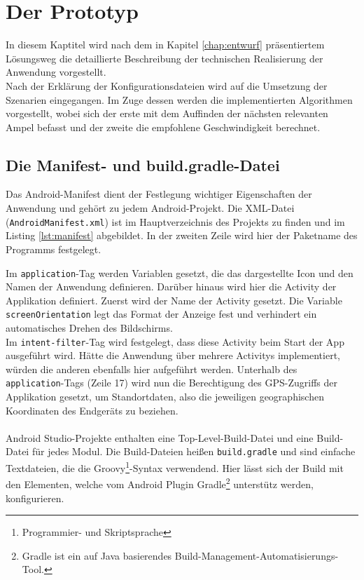 \chapter{\label{chap:implementierung}Der Prototyp}
In diesem Kaptitel wird nach dem in Kapitel \ref{chap:entwurf} präsentiertem Lösungsweg die detaillierte Beschreibung der technischen Realisierung der Anwendung vorgestellt.\\
Nach der Erklärung der Konfigurationsdateien wird auf die Umsetzung der Szenarien eingegangen. Im Zuge dessen werden die implementierten Algorithmen vorgestellt, wobei sich der erste mit dem Auffinden der nächsten relevanten Ampel befasst und der zweite die empfohlene Geschwindigkeit berechnet.
%
%
\section{Die Manifest- und build.gradle-Datei}
Das Android-Manifest dient der Festlegung wichtiger Eigenschaften der Anwendung und gehört zu jedem Android-Projekt. Die \gls{XML}-Datei (\texttt{AndroidManifest.xml}) ist im Hauptverzeichnis des Projekts zu finden und im Listing \ref{lst:manifest} abgebildet. In der zweiten Zeile wird hier der Paketname des Programms festgelegt. 
\begin{center}
\grayRule 
\grayRule
\end{center}
Im \texttt{application}-Tag werden Variablen gesetzt, die das dargestellte Icon und den Namen der Anwendung definieren. Darüber hinaus wird hier die \gls{Activity} der Applikation definiert. Zuerst wird der Name der \gls{Activity} gesetzt. Die Variable \texttt{screenOrientation} legt das Format der Anzeige fest und verhindert ein automatisches Drehen des Bildschirms. \\
Im \texttt{intent-filter}-Tag wird festgelegt, dass diese Activity beim Start der App ausgeführt wird. Hätte die Anwendung über mehrere \glspl{Activity} implementiert, würden die anderen ebenfalls hier aufgeführt werden.
Unterhalb des \texttt{application}-Tags (Zeile 17) wird nun die Berechtigung des \gls{GPS}-Zugriffs der Applikation gesetzt, um Standortdaten, also die jeweiligen geographischen Koordinaten des Endgeräts zu beziehen.\\\\
Android Studio-Projekte enthalten eine Top-Level-Build-Datei und eine Build-Datei für jedes Modul. Die Build-Dateien heißen \texttt{build.gradle} und sind einfache Textdateien, die die Groovy\footnote{ Programmier- und Skriptsprache}-Syntax verwendend. Hier lässt sich der Build mit den Elementen, welche vom Android Plugin Gradle\footnote{ Gradle ist ein auf Java basierendes Build-Management-Automatisierungs-Tool.} unterstütz werden, konfigurieren. \cite{android_build} \\ 
